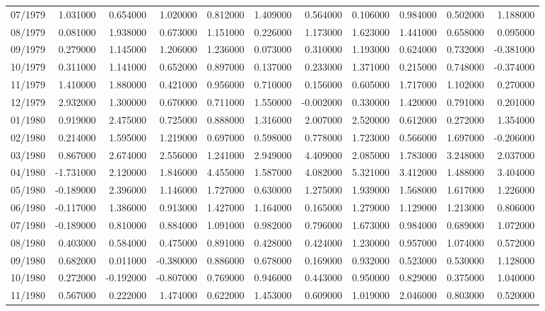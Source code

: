 \begin{tabular}{lrrrrrrrrrr}
07/1979 & 1.031000 & 0.654000 & 1.020000 & 0.812000 & 1.409000 & 0.564000 & 0.106000 & 0.984000 & 0.502000 & 1.188000 \\
08/1979 & 0.081000 & 1.938000 & 0.673000 & 1.151000 & 0.226000 & 1.173000 & 1.623000 & 1.441000 & 0.658000 & 0.095000 \\
09/1979 & 0.279000 & 1.145000 & 1.206000 & 1.236000 & 0.073000 & 0.310000 & 1.193000 & 0.624000 & 0.732000 & -0.381000 \\
10/1979 & 0.311000 & 1.141000 & 0.652000 & 0.897000 & 0.137000 & 0.233000 & 1.371000 & 0.215000 & 0.748000 & -0.374000 \\
11/1979 & 1.410000 & 1.880000 & 0.421000 & 0.956000 & 0.710000 & 0.156000 & 0.605000 & 1.717000 & 1.102000 & 0.270000 \\
12/1979 & 2.932000 & 1.300000 & 0.670000 & 0.711000 & 1.550000 & -0.002000 & 0.330000 & 1.420000 & 0.791000 & 0.201000 \\
01/1980 & 0.919000 & 2.475000 & 0.725000 & 0.888000 & 1.316000 & 2.007000 & 2.520000 & 0.612000 & 0.272000 & 1.354000 \\
02/1980 & 0.214000 & 1.595000 & 1.219000 & 0.697000 & 0.598000 & 0.778000 & 1.723000 & 0.566000 & 1.697000 & -0.206000 \\
03/1980 & 0.867000 & 2.674000 & 2.556000 & 1.241000 & 2.949000 & 4.409000 & 2.085000 & 1.783000 & 3.248000 & 2.037000 \\
04/1980 & -1.731000 & 2.120000 & 1.846000 & 4.455000 & 1.587000 & 4.082000 & 5.321000 & 3.412000 & 1.488000 & 3.404000 \\
05/1980 & -0.189000 & 2.396000 & 1.146000 & 1.727000 & 0.630000 & 1.275000 & 1.939000 & 1.568000 & 1.617000 & 1.226000 \\
06/1980 & -0.117000 & 1.386000 & 0.913000 & 1.427000 & 1.164000 & 0.165000 & 1.279000 & 1.129000 & 1.213000 & 0.806000 \\
07/1980 & -0.189000 & 0.810000 & 0.884000 & 1.091000 & 0.982000 & 0.796000 & 1.673000 & 0.984000 & 0.689000 & 1.072000 \\
08/1980 & 0.403000 & 0.584000 & 0.475000 & 0.891000 & 0.428000 & 0.424000 & 1.230000 & 0.957000 & 1.074000 & 0.572000 \\
09/1980 & 0.682000 & 0.011000 & -0.380000 & 0.886000 & 0.678000 & 0.169000 & 0.932000 & 0.523000 & 0.530000 & 1.128000 \\
10/1980 & 0.272000 & -0.192000 & -0.807000 & 0.769000 & 0.946000 & 0.443000 & 0.950000 & 0.829000 & 0.375000 & 1.040000 \\
11/1980 & 0.567000 & 0.222000 & 1.474000 & 0.622000 & 1.453000 & 0.609000 & 1.019000 & 2.046000 & 0.803000 & 0.520000 \\

\end{tabular}
